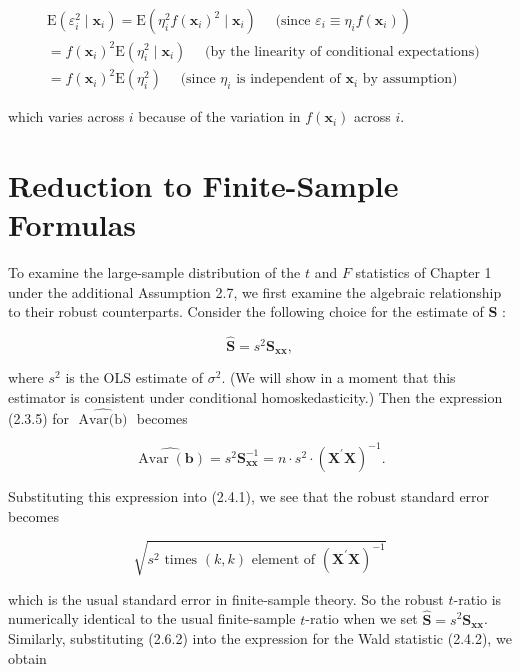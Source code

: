 \documentclass[10pt]{article}
\begin{document}
$$
\begin{aligned}
& \left.\mathrm{E}\left(\varepsilon_{i}^{2} \mid \mathbf{x}_{i}\right)=\mathrm{E}\left(\eta_{i}^{2} f\left(\mathbf{x}_{i}\right)^{2} \mid \mathbf{x}_{i}\right) \quad \text { (since } \varepsilon_{i} \equiv \eta_{i} f\left(\mathbf{x}_{i}\right)\right) \\
& =f\left(\mathbf{x}_{i}\right)^{2} \mathrm{E}\left(\eta_{i}^{2} \mid \mathbf{x}_{i}\right) \quad \text { (by the linearity of conditional expectations) } \\
& =f\left(\mathbf{x}_{i}\right)^{2} \mathrm{E}\left(\eta_{i}^{2}\right) \quad \text { (since } \eta_{i} \text { is independent of } \mathbf{x}_{i} \text { by assumption) }
\end{aligned}
$$

which varies across $i$ because of the variation in $f\left(\mathbf{x}_{i}\right)$ across $i$.

\section*{Reduction to Finite-Sample Formulas}
To examine the large-sample distribution of the $t$ and $F$ statistics of Chapter 1 under the additional Assumption 2.7, we first examine the algebraic relationship to their robust counterparts. Consider the following choice for the estimate of $\mathbf{S}$ :

$$
\widehat{\mathbf{S}}=s^{2} \mathbf{S}_{\mathbf{x x}},
$$

where $s^{2}$ is the OLS estimate of $\sigma^{2}$. (We will show in a moment that this estimator is consistent under conditional homoskedasticity.) Then the expression (2.3.5) for $\widehat{\text { Avar(b) }}$ becomes


\begin{equation*}
\widehat{\operatorname{Avar}(\mathbf{b})}=s^{2} \mathbf{S}_{\mathbf{x x}}^{-1}=n \cdot s^{2} \cdot\left(\mathbf{X}^{\prime} \mathbf{X}\right)^{-1} . \tag{2.6.2}
\end{equation*}


Substituting this expression into (2.4.1), we see that the robust standard error becomes


\begin{equation*}
\sqrt{s^{2} \text { times }(k, k) \text { element of }\left(\mathbf{X}^{\prime} \mathbf{X}\right)^{-1}} \tag{2.6.3}
\end{equation*}


which is the usual standard error in finite-sample theory. So the robust $t$-ratio is numerically identical to the usual finite-sample $t$-ratio when we set $\widehat{\mathbf{S}}=s^{2} \mathbf{S}_{\mathbf{x x}}$. Similarly, substituting (2.6.2) into the expression for the Wald statistic (2.4.2), we obtain
\end{document}
